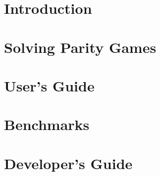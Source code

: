 \documentclass[open=left,twopage=true]{scrreprt}
\begin{document}
\maketitle[0]

\cleardoublepage
{}
\tableofcontents

\chapter{Introduction}



\chapter{Solving Parity Games}
\label{chp:pgames}









\chapter{User's Guide}
\label{chp:uguide}









\chapter{Benchmarks}
\label{chp:benchmarks}


%

\chapter{Developer's Guide}
\label{chp:dguide}







\cleardoublepage
{}


\end{document}
